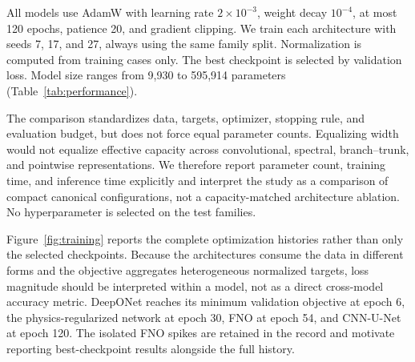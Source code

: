 \documentclass[conference]{IEEEtran}
\begin{document}
\begin{table}[t]
\caption{Surrogate representations and measured inference cost per case.}
\label{tab:architectures}
\centering
{}
\end{table}

All models use AdamW with learning rate $2\times10^{-3}$, weight decay
$10^{-4}$, at most 120 epochs, patience 20, and gradient clipping. We train
each architecture with seeds 7, 17, and 27, always using the same family split.
Normalization is computed from training cases only. The best checkpoint is
selected by validation loss. Model size ranges from 9,930 to 595,914 parameters
(Table~\ref{tab:performance}).

The comparison standardizes data, targets, optimizer, stopping rule, and
evaluation budget, but does not force equal parameter counts. Equalizing width
would not equalize effective capacity across convolutional, spectral,
branch--trunk, and pointwise representations. We therefore report parameter
count, training time, and inference time explicitly and interpret the study as
a comparison of compact canonical configurations, not a capacity-matched
architecture ablation. No hyperparameter is selected on the test families.

Figure~\ref{fig:training} reports the complete optimization histories rather
than only the selected checkpoints. Because the architectures consume the data
in different forms and the objective aggregates heterogeneous normalized
targets, loss magnitude should be interpreted within a model, not as a direct
cross-model accuracy metric. DeepONet reaches its minimum validation objective
at epoch 6, the physics-regularized network at epoch 30, FNO at epoch 54, and
CNN-U-Net at epoch 120. The isolated FNO spikes are retained in the record and
motivate reporting best-checkpoint results alongside the full history.
\end{document}
